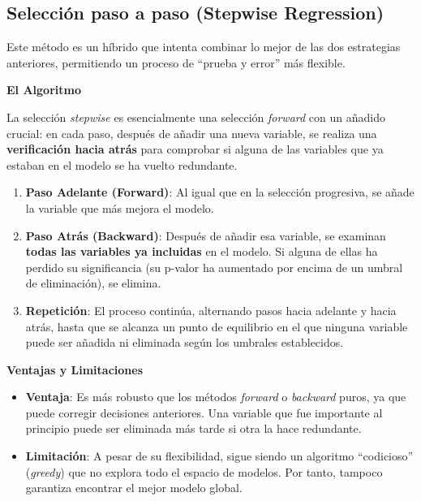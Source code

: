 \documentclass[
  letterpaper,
  DIV=11,
  numbers=noendperiod]{scrreprt}
\providecommand{\tightlist}{%
  \setlength{\itemsep}{0pt}\setlength{\parskip}{0pt}}
\begin{document}
\subsection{Selección paso a paso (Stepwise
Regression)}\label{selecciuxf3n-paso-a-paso-stepwise-regression}

Este método es un híbrido que intenta combinar lo mejor de las dos
estrategias anteriores, permitiendo un proceso de ``prueba y error'' más
flexible.

\textbf{El Algoritmo}

La selección \emph{stepwise} es esencialmente una selección
\emph{forward} con un añadido crucial: en cada paso, después de añadir
una nueva variable, se realiza una \textbf{verificación hacia atrás}
para comprobar si alguna de las variables que ya estaban en el modelo se
ha vuelto redundante.

\begin{enumerate}
\def\labelenumi{\arabic{enumi}.}
\tightlist
\item
  \textbf{Paso Adelante (Forward)}: Al igual que en la selección
  progresiva, se añade la variable que más mejora el modelo.
\item
  \textbf{Paso Atrás (Backward)}: Después de añadir esa variable, se
  examinan \textbf{todas las variables ya incluidas} en el modelo. Si
  alguna de ellas ha perdido su significancia (su p-valor ha aumentado
  por encima de un umbral de eliminación), se elimina.
\item
  \textbf{Repetición}: El proceso continúa, alternando pasos hacia
  adelante y hacia atrás, hasta que se alcanza un punto de equilibrio en
  el que ninguna variable puede ser añadida ni eliminada según los
  umbrales establecidos.
\end{enumerate}

\textbf{Ventajas y Limitaciones}

\begin{itemize}
\tightlist
\item
  \textbf{Ventaja}: Es más robusto que los métodos \emph{forward} o
  \emph{backward} puros, ya que puede corregir decisiones anteriores.
  Una variable que fue importante al principio puede ser eliminada más
  tarde si otra la hace redundante.
\item
  \textbf{Limitación}: A pesar de su flexibilidad, sigue siendo un
  algoritmo ``codicioso'' (\emph{greedy}) que no explora todo el espacio
  de modelos. Por tanto, tampoco garantiza encontrar el mejor modelo
  global.
\end{itemize}
\end{document}
